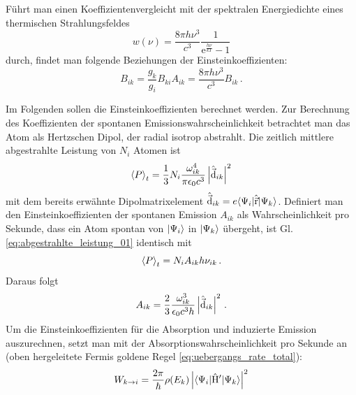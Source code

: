 Führt man einen Koeffizientenvergleicht mit der spektralen
Energiedichte eines thermischen Strahlungsfeldes \cite{demtroeder:ex3}
\begin{equation}\label{eq:spektrale_energiedichte_2}
	w(\nu)=\frac{8\pi h\nu^3}{c^3}\frac{1}{\mathrm{e}^\frac{h\nu}{kT}-1}
\end{equation}
durch, findet man folgende Beziehungen der Einsteinkoeffizienten:
\begin{subequations}\label{eq:einsteinkoeff_relationen}
	\begin{equation}\label{eq:einsteinkoeff_relationen_1}
		B_{ik}=\frac{g_k}{g_i}B_{ki}
	\end{equation}
	\begin{equation}\label{eq:einsteinkoeff_relationen_2}
		A_{ik}=\frac{8\pi h\nu^3}{c^3}B_{ik}\,.
	\end{equation}
\end{subequations}
\par
Im Folgenden sollen die Einsteinkoeffizienten berechnet werden.
Zur Berechnung des Koeffizienten der spontanen Emissionswahrscheinlichkeit
betrachtet man das Atom als Hertzschen Dipol, der radial isotrop abstrahlt. Die
zeitlich mittlere abgestrahlte Leistung von $N_i$ Atomen
\cite{demtroeder:ex3} ist
\begin{equation}\label{eq:abgestrahlte_leistung_01}
	\left\langle P\right\rangle_t = \frac{1}{3}N_i\frac{\omega_{ik}^4}{\pi\epsilon_0
	c^3}\left|\hat{\vec{\mathrm{d}}}_{ik}\right|^2
\end{equation}
mit dem bereits erwähnte Dipolmatrixelement
$\hat{\vec{\mathrm{d}}}_{ik}=e\langle{\Psi_i}|\hat{\vec{\mathrm{r}}}|{\Psi_k}\rangle$. Definiert man den
Einsteinkoeffizienten der spontanen Emission $A_{ik}$ als Wahrscheinlichkeit pro
Sekunde, dass ein Atom spontan von $|{\Psi_i}\rangle$ in $|{\Psi_k}\rangle$ übergeht,
ist Gl. \eqref{eq:abgestrahlte_leistung_01} identisch mit
\begin{equation}\label{eq:abgestrahlte_leistung_02}
	\left\langle P\right\rangle_t=N_iA_{ik}h\nu_{ik}\,.
\end{equation}
Daraus folgt
\begin{equation}\label{eq:einstein_koeff_A}
	A_{ik}=\frac{2}{3}\frac{\omega_{ik}^3}{\epsilon_0c^3h}\left|\hat{\vec{\mathrm{d}}}_{ik}\right|^2\,.
\end{equation}
Um die Einsteinkoeffizienten für die Absorption und induzierte Emission
auszurechnen, setzt man mit der Absorptionswahrscheinlichkeit pro Sekunde an
(oben hergeleitete Fermis goldene Regel \eqref{eq:uebergangs_rate_total}):
\begin{equation}\label{eq:w_ki_01}
	W_{k\to i}
	= \frac{2\pi}{\hbar}\rho(E_k)\left|\langle{\Psi_i}|\hat{\mathrm{H}}'|{\Psi_k}\rangle\right|^2
\end{equation}

